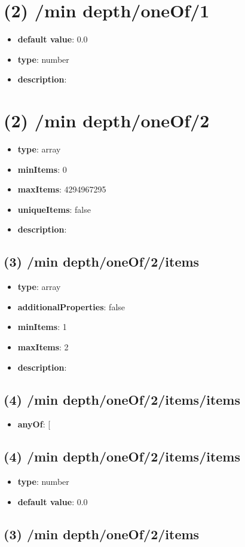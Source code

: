 \section{(2) /min depth/oneOf/1}
\begin{itemize}[leftmargin=2em]\item {\bf default value}: 0.0
\item {\bf type}: number
\item {\bf description}: 
\end{itemize}\section{(2) /min depth/oneOf/2}
\begin{itemize}[leftmargin=2em]\item {\bf type}: array
\item {\bf minItems}: 0
\item {\bf maxItems}: 4294967295
\item {\bf uniqueItems}: false
\item {\bf description}: 
\end{itemize}\subsection{(3) /min depth/oneOf/2/items}
\begin{itemize}[leftmargin=3em]\item {\bf type}: array
\item {\bf additionalProperties}: false
\item {\bf minItems}: 1
\item {\bf maxItems}: 2
\item {\bf description}: 
\end{itemize}\subsection{(4) /min depth/oneOf/2/items/items}
\begin{itemize}[leftmargin=4em]\item {\bf anyOf}: [\end{itemize}\subsection{(4) /min depth/oneOf/2/items/items}
\begin{itemize}[leftmargin=4em]\item {\bf type}: number\item {\bf default value}: 0.0
\end{itemize}\subsection{(3) /min depth/oneOf/2/items}
